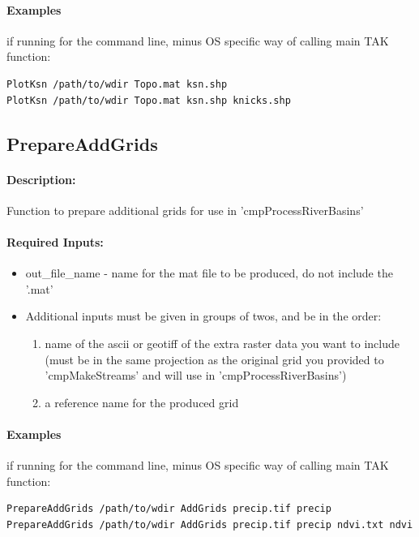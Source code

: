 \paragraph{Examples} if running for the command line, minus OS specific way of calling main TAK function:
\begin{lstlisting}[language=bash]
PlotKsn /path/to/wdir Topo.mat ksn.shp
PlotKsn /path/to/wdir Topo.mat ksn.shp knicks.shp
\end{lstlisting}

\subsection{PrepareAddGrids}
\paragraph{Description:}
Function to prepare additional grids for use in 'cmpProcessRiverBasins'

\paragraph{Required Inputs:}
\begin{itemize}
\item out\_file\_name - name for the mat file to be produced, do not include the '.mat'

\item Additional inputs must be given in groups of twos, and be in the order: 
\begin{enumerate}
\item name of the ascii or geotiff of the extra raster data you want to include (must be in the same projection
as the original grid you provided to 'cmpMakeStreams' and will use in 'cmpProcessRiverBasins')
\item a reference name for the produced grid
\end{enumerate}
\end{itemize}

\paragraph{Examples} if running for the command line, minus OS specific way of calling main TAK function:
\begin{lstlisting}[language=bash]
PrepareAddGrids /path/to/wdir AddGrids precip.tif precip
PrepareAddGrids /path/to/wdir AddGrids precip.tif precip ndvi.txt ndvi  
\end{lstlisting}


